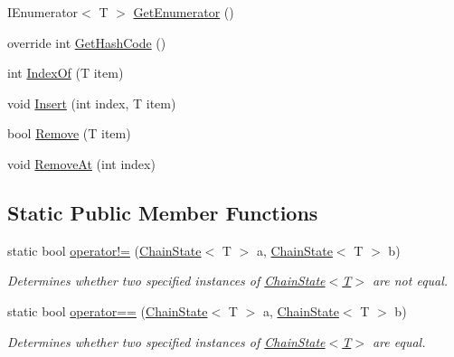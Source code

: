 \begin{DoxyCompactItemize}
I\+Enumerator$<$ T $>$ \mbox{\hyperlink{class_markov_1_1_chain_state_a81c94c2203e25ac36ba1ddd178fc2b15}{Get\+Enumerator}} ()
\item 
override int \mbox{\hyperlink{class_markov_1_1_chain_state_aaadb2ec85a68a5c70f18b0d163230134}{Get\+Hash\+Code}} ()
\item 
int \mbox{\hyperlink{class_markov_1_1_chain_state_a2af30e4d2673359b79bfaa6a2de48bf9}{Index\+Of}} (T item)
\item 
void \mbox{\hyperlink{class_markov_1_1_chain_state_ad5efce337d44856d13229069afff0879}{Insert}} (int index, T item)
\item 
bool \mbox{\hyperlink{class_markov_1_1_chain_state_a14ba6dd48c8f96ae8c396779ac6fbbc3}{Remove}} (T item)
\item 
void \mbox{\hyperlink{class_markov_1_1_chain_state_af04b4b8af2b5de82f276a74087a1d500}{Remove\+At}} (int index)
\end{DoxyCompactItemize}
\subsection*{Static Public Member Functions}
\begin{DoxyCompactItemize}
\item 
static bool \mbox{\hyperlink{class_markov_1_1_chain_state_a6461dd479522fd7d95f2e86a166187f4}{operator!=}} (\mbox{\hyperlink{class_markov_1_1_chain_state}{Chain\+State}}$<$ T $>$ a, \mbox{\hyperlink{class_markov_1_1_chain_state}{Chain\+State}}$<$ T $>$ b)
\begin{DoxyCompactList}\small\item\em Determines whether two specified instances of \mbox{\hyperlink{class_markov_1_1_chain_state_a350f2699a1eb55d8b041ff394c6ae3d4}{Chain\+State$<$\+T$>$}} are not equal. \end{DoxyCompactList}\item 
static bool \mbox{\hyperlink{class_markov_1_1_chain_state_a89707d9945ed200acc226df512001169}{operator==}} (\mbox{\hyperlink{class_markov_1_1_chain_state}{Chain\+State}}$<$ T $>$ a, \mbox{\hyperlink{class_markov_1_1_chain_state}{Chain\+State}}$<$ T $>$ b)
\begin{DoxyCompactList}\small\item\em Determines whether two specified instances of \mbox{\hyperlink{class_markov_1_1_chain_state_a350f2699a1eb55d8b041ff394c6ae3d4}{Chain\+State$<$\+T$>$}} are equal. \end{DoxyCompactList}\end{DoxyCompactItemize}
